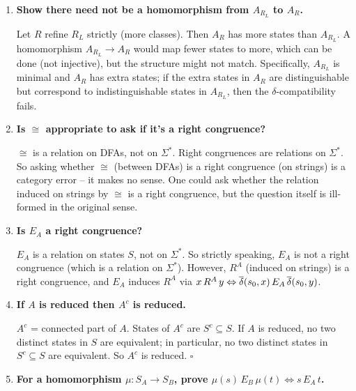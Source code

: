 \begin{enumerate}[{3.}1.]
If $s_1$ is unreachable but $L(A^{s_1})=L(A^{s_0})$, so $s_1\,E_A\,s_0$, then map $s_1\mapsto\psi(s_0)=[x_{s_0}]_{R_L}$. This extends the homomorphism to the disconnected state.

\item \textbf{Show there need not be a homomorphism from $A_{R_L}$ to $A_R$.}

Let $R$ refine $R_L$ strictly (more classes). Then $A_R$ has more states than $A_{R_L}$. A homomorphism $A_{R_L}\to A_R$ would map fewer states to more, which can be done (not injective), but the structure might not match. Specifically, $A_{R_L}$ is minimal and $A_R$ has extra states; if the extra states in $A_R$ are distinguishable but correspond to indistinguishable states in $A_{R_L}$, then the $\delta$-compatibility fails.

\item \textbf{Is $\cong$ appropriate to ask if it's a right congruence?}

$\cong$ is a relation on DFAs, not on $\Sigma^*$. Right congruences are relations on $\Sigma^*$. So asking whether $\cong$ (between DFAs) is a right congruence (on strings) is a category error -- it makes no sense. One could ask whether the relation induced on strings by $\cong$ is a right congruence, but the question itself is ill-formed in the original sense.

\item \textbf{Is $E_A$ a right congruence?}

$E_A$ is a relation on states $S$, not on $\Sigma^*$. So strictly speaking, $E_A$ is not a right congruence (which is a relation on $\Sigma^*$). However, $R^A$ (induced on strings) is a right congruence, and $E_A$ induces $R^A$ via $x\,R^A\,y\Leftrightarrow\overline{\delta}(s_0,x)\,E_A\,\overline{\delta}(s_0,y)$.

\item \textbf{If $A$ is reduced then $A^c$ is reduced.}

$A^c$ = connected part of $A$. States of $A^c$ are $S^c\subseteq S$. If $A$ is reduced, no two distinct states in $S$ are equivalent; in particular, no two distinct states in $S^c\subseteq S$ are equivalent. So $A^c$ is reduced. $\square$

\item \textbf{For a homomorphism $\mu: S_A\to S_B$, prove $\mu(s)\,E_B\,\mu(t)\Leftrightarrow s\,E_A\,t$.}


\end{enumerate}
